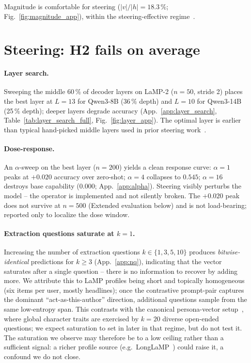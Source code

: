 \documentclass{article}
\begin{document}
Magnitude is comfortable for steering ($|v|/|h|{=}18.3\,\%$;
Fig.~\ref{fig:magnitude_app}), within the steering-effective
regime~\cite{rimsky2024caa,chen2025persona}.

\section{Steering: H2 fails on average}
\label{sec:experiments}

\paragraph{Layer search.} Sweeping the middle 60\,\% of decoder layers
on LaMP-2 ($n{=}50$, stride 2) places the best layer at $L{=}13$ for
Qwen3-8B (36\,\% depth) and $L{=}10$ for Qwen3-14B (25\,\% depth);
deeper layers degrade accuracy (App.~\ref{app:layer_search},
Table~\ref{tab:layer_search_full}, Fig.~\ref{fig:layer_app}). The
optimal layer is earlier than typical hand-picked middle layers used
in prior steering work~\cite{rimsky2024caa,arditi2024refusal}.

\paragraph{Dose-response.} An $\alpha$-sweep on the best layer
($n{=}200$) yields a clean response curve: $\alpha{=}1$ peaks at
$+0.020$ accuracy over zero-shot; $\alpha{=}4$ collapses to $0.545$;
$\alpha{=}16$ destroys base capability ($0.000$;
App.~\ref{app:alpha}). Steering visibly perturbs the model -- the
operator is implemented and not silently broken.  The $+0.020$ peak
does not survive at $n{=}500$ (Extended evaluation below) and is
not load-bearing; reported only to localize the dose window.

\paragraph{Extraction questions saturate at $k{=}1$.} Increasing the
number of extraction questions $k\!\in\!\{1,3,5,10\}$ produces
\emph{bitwise-identical} predictions for $k{\ge}3$ (App.~\ref{app:nq}),
indicating that the vector saturates after a single question -- there
is no information to recover by adding more.  We attribute this to
LaMP profiles being short and topically homogeneous (six items per
user, mostly headlines); once the contrastive prompt-pair captures
the dominant ``act-as-this-author'' direction, additional questions
sample from the same low-entropy span.  This contrasts with the
canonical persona-vector setup~\cite{chen2025persona}, where global
character traits are exercised by $k{=}20$ diverse open-ended
questions; we expect saturation to set in later in that regime,
but do not test it.  The saturation we observe may therefore be to
a low ceiling rather than a sufficient signal: a richer profile
source (e.g.\ LongLaMP~\cite{kumar2024longlamp}) could raise it,
a confound we do not close.
\end{document}
